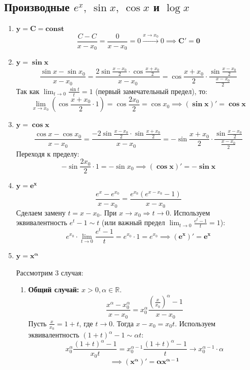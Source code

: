 \subsection{Производные $e^x,\ \sin x,\ \cos x$ и $\log x$}

\begin{enumerate}
	\item $\mathbf{y = C = \text{const}}$
	\[ \frac{C - C}{x - x_0} = \frac{0}{x - x_0} = 0 \xrightarrow{x\to x_0} 0 \implies \mathbf{C' = 0} \]

	\item $\mathbf{y = \sin x}$
	\[ \frac{\sin x - \sin x_0}{x - x_0} = \frac{2\sin \frac{x - x_0}{2} \cdot \cos \frac{x + x_0}{2}}{x - x_0} = \cos \frac{x + x_0}{2} \cdot \frac{\sin \frac{x - x_0}{2}}{\frac{x - x_0}{2}} \]
	Так как $\lim_{t\to 0} \frac{\sin t}{t} = 1$ (первый замечательный предел), то:
	\[ \lim_{x\to x_0} \left( \cos \frac{x + x_0}{2} \cdot 1 \right) = \cos \frac{2x_0}{2} = \cos x_0 \implies \mathbf{(\sin x)' = \cos x} \]

	\item $\mathbf{y = \cos x}$
	\[ \frac{\cos x - \cos x_0}{x - x_0} = \frac{-2\sin \frac{x - x_0}{2} \cdot \sin \frac{x + x_0}{2}}{x - x_0} = -\sin \frac{x + x_0}{2} \cdot \frac{\sin \frac{x - x_0}{2}}{\frac{x - x_0}{2}} \]
	Переходя к пределу:
	\[ -\sin \frac{2x_0}{2} \cdot 1 = -\sin x_0 \implies \mathbf{(\cos x)' = -\sin x} \]

	\item $\mathbf{y = e^x}$
	\[ \frac{e^x - e^{x_0}}{x - x_0} = \frac{e^{x_0}(e^{x - x_0} - 1)}{x - x_0} \]
	Сделаем замену $t = x - x_0$. При $x \to x_0 \Rightarrow t \to 0$.
	Используем эквивалентность $e^t - 1 \sim t$ (или важный предел $\lim_{t\to 0}\frac{e^t-1}{t}=1$):
	\[ e^{x_0} \cdot \lim_{t\to 0} \frac{e^t - 1}{t} = e^{x_0} \cdot 1 = e^{x_0} \implies \mathbf{(e^x)' = e^x} \]

	\item $\mathbf{y = x^\alpha}$
	
	Рассмотрим 3 случая:
	\begin{enumerate}
		\item \textbf{Общий случай:} $x > 0, \alpha \in \mathbb{R}$.
		\[ \frac{x^\alpha - x_0^\alpha}{x - x_0} = x_0^\alpha \frac{(\frac{x}{x_0})^\alpha - 1}{x - x_0} \]
		Пусть $\frac{x}{x_0} = 1 + t$, где $t \to 0$. Тогда $x - x_0 = x_0 t$.
		Используем эквивалентность $(1+t)^\alpha - 1 \sim \alpha t$:
		\[ x_0^\alpha \frac{(1+t)^\alpha - 1}{x_0 t} = x_0^{\alpha - 1} \frac{(1+t)^\alpha - 1}{t} \to x_0^{\alpha - 1} \cdot \alpha \]
		\[ \implies \mathbf{(x^\alpha)' = \alpha x^{\alpha-1}} \]


\end{enumerate}
\end{enumerate}

